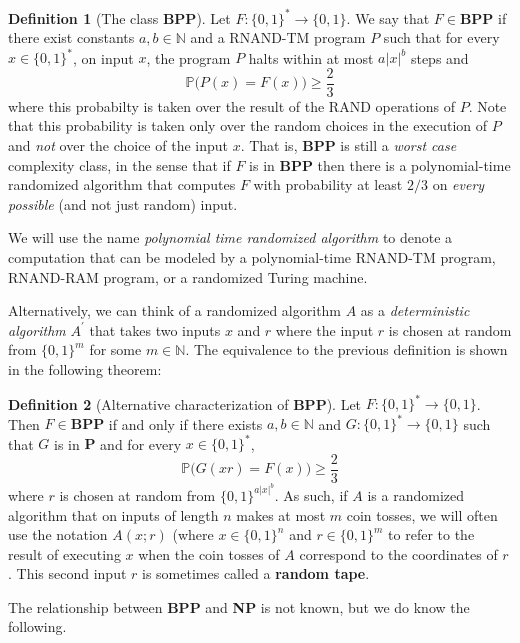 \documentclass[a4paper, 12pt]{report}
\theoremstyle{remark}
\theoremstyle{definition}
\newtheorem{definition}{Definition}[section]
\begin{document}
\begin{definition}[The class \textbf{BPP}]
Let $F: \{0, 1\}^* \longrightarrow \{0,1\}$. We say that $F \in \mathbf{BPP}$ if there exist constants $a, b \in \mathbb{N}$ and a RNAND-TM program $P$ such that for every $x \in \{0,1\}^*$, on input $x$, the program $P$ halts within at most $a |x|^b$ steps and 
\[\mathbb{P} \big(P(x) = F(x)\big) \geq \frac{2}{3}\]
where this probabilty is taken over the result of the RAND operations of $P$. Note that this probability is taken only over the random choices in the execution of $P$ and \textit{not} over the choice of the input $x$. That is, \textbf{BPP} is still a \textit{worst case} complexity class, in the sense that if $F$ is in \textbf{BPP} then there is a polynomial-time randomized algorithm that computes $F$ with probability at least $2/3$ on \textit{every possible} (and not just random) input. 
\end{definition}

We will use the name \textit{polynomial time randomized algorithm} to denote a computation that can be modeled by a polynomial-time RNAND-TM program, RNAND-RAM program, or a randomized Turing machine. 

Alternatively, we can think of a randomized algorithm $A$ as a \textit{deterministic algorithm} $A^\prime$ that takes two inputs $x$ and $r$ where the input $r$ is chosen at random from $\{0, 1\}^m$ for some $m \in \mathbb{N}$. The equivalence to the previous definition is shown in the following theorem: 

\begin{definition}[Alternative characterization of \textbf{BPP}]
Let $F: \{0, 1\}^* \longrightarrow \{0, 1\}$. Then $F \in \mathbf{BPP}$ if and only if there exists $a, b \in \mathbb{N}$ and $G: \{0, 1\}^* \longrightarrow \{0, 1\}$ such that $G$ is in $\mathbf{P}$ and for every $x \in \{0, 1\}^*$, 
\[\mathbb{P}\big( G(xr) = F(x)\big) \geq \frac{2}{3}\]
where $r$ is chosen at random from $\{0, 1\}^{a|x|^b}$. As such, if $A$ is a randomized algorithm that on inputs of length $n$ makes at most $m$ coin tosses, we will often use the notation $A(x; r)$ (where $x \in \{0, 1\}^n$ and $r \in \{0, 1\}^m$ to refer to the result of executing $x$ when the coin tosses of $A$ correspond to the coordinates of $r$. This second input $r$ is sometimes called a \textbf{random tape}.
\end{definition}

The relationship between \textbf{BPP} and \textbf{NP} is not known, but we do know the following. 
\end{document}
